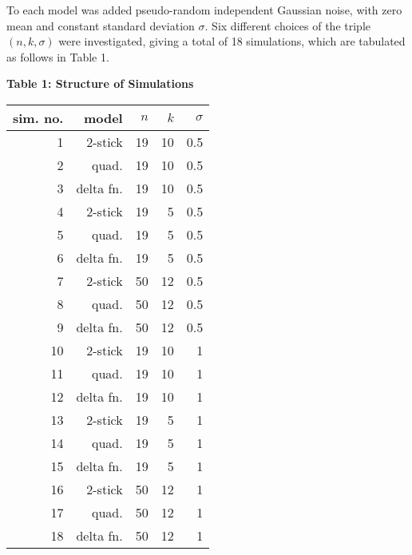To each model was added pseudo-random independent Gaussian noise,
with zero mean and constant standard deviation $\sigma$.  Six
different choices of the triple $(n,k,\sigma)$ were investigated,
giving a total of 18 simulations, which are tabulated as follows in
Table 1.

\begin{table}[htb]
\begin{centre} {\bf Table 1:  Structure
of Simulations}\\[0.5cm]

\begin{tabular} {| r | r | r | r | r |} \hline
sim. no. & model & $n$ & $k$ & $\sigma$ \\ \hline
1 & 2-stick     & 19          & 10          & 0.5 \\ \hline
2 & quad.       & 19          & 10          & 0.5 \\ \hline
3 & delta fn.   & 19          & 10          & 0.5 \\ \hline
4 & 2-stick     & 19          & 5           & 0.5 \\ \hline
5 & quad.       & 19          & 5           & 0.5 \\ \hline
6 & delta fn.   & 19          & 5           & 0.5 \\ \hline
7 & 2-stick     & 50          & 12          & 0.5 \\ \hline
8 & quad.       & 50          & 12          & 0.5 \\ \hline
9 & delta fn.   & 50          & 12          & 0.5 \\ \hline
10 & 2-stick     & 19          & 10          & 1   \\ \hline
11 & quad.       & 19          & 10          & 1   \\ \hline
12 & delta fn.   & 19          & 10          & 1   \\ \hline
13 & 2-stick     & 19          & 5           & 1   \\ \hline
14 & quad.       & 19          & 5           & 1   \\ \hline
15 & delta fn.   & 19          & 5           & 1   \\ \hline
16 & 2-stick     & 50          & 12          & 1   \\ \hline
17 & quad.       & 50          & 12          & 1   \\ \hline
18 & delta fn.   & 50          & 12          & 1   \\ \hline
\end{tabular} 
\end{centre}
\end{table}

